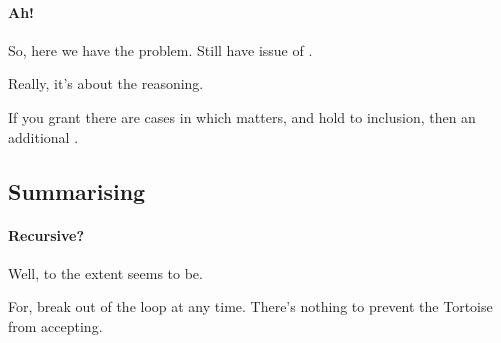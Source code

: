 \paragraph{Ah!}

\begin{note}
  So, here we have the problem.
  Still have issue of \requ{}.

  Really, it's about the reasoning.

  If you grant there are cases in which \qzS{} matters, and hold to inclusion, then an additional \requ{}.
\end{note}

\subsection{Summarising}
\label{sec:summarising}

\paragraph{Recursive?}

\begin{note}
  Well, to the extent \citeauthor{Carroll:1895uj} seems to be.

  For, break out of the loop at any time.
  There's nothing to prevent the Tortoise from accepting.
\end{note}





